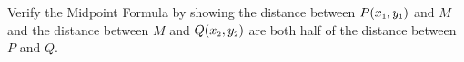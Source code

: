 {\label{verifymidpointformula} Verify the Midpoint Formula by showing the distance between $P(x_{\mbox{\tiny$1$}}, y_{\mbox{\tiny$1$}})$ and $M$ and the distance between $M$ and $Q(x_{\mbox{\tiny$2$}}, y_{\mbox{\tiny$2$}})$ are both half of the distance between $P$ and $Q$.}
{}
